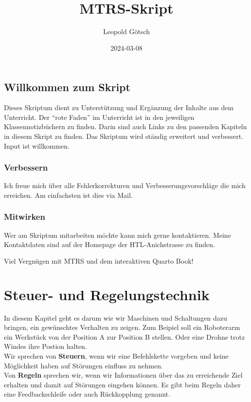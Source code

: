 \documentclass[
  letterpaper,
  DIV=11]{scrreprt}
\title{MTRS-Skript}
\author{Leopold Götsch}
\date{2024-03-08}
\renewcommand*\contentsname{Inhaltsverzeichnis}
\newcommand\contentsname{Inhaltsverzeichnis}
\begin{document}
\maketitle

\renewcommand*\contentsname{Inhaltsverzeichnis}
{
\hypersetup{linkcolor=}
\setcounter{tocdepth}{2}
\tableofcontents
}

\chapter*{Willkommen zum Skript}\label{willkommen-zum-skript}


Dieses Skriptum dient zu Unterstützung und Ergänzung der Inhalte aus dem
Unterricht. Der ``rote Faden'' im Unterricht ist in den jeweiligen
Klassennotizbüchern zu finden. Darin sind auch Links zu den passenden
Kapiteln in diesem Skript zu finden. Das Skriptum wird ständig erweitert
und verbessert. Input ist willkommen.

\section*{Verbessern}\label{verbessern}


Ich freue mich über alle Fehlerkorrekturen und Verbesserungsvorschläge
die mich erreichen. Am einfachsten ist dies via Mail.

\section*{Mitwirken}\label{mitwirken}


Wer am Skriptum mitarbeiten möchte kann mich gerne kontaktieren. Meine
Kontaktdaten sind auf der Homepage der HTL-Anichstrasse zu finden.

Viel Vergnügen mit MTRS und dem interaktiven Quarto Book!

\part{Steuer- und Regelungstechnik}

In diesem Kapitel geht es darum wie wir Maschinen und Schaltungen dazu
bringen, ein gewünschtes Verhalten zu zeigen. Zum Beipiel soll ein
Roboterarm ein Werkstück von der Position A zur Position B stellen. Oder
eine Drohne trotz Windes ihre Postion halten.\\
Wir sprechen von \textbf{Steuern}, wenn wir eine Befehlskette vorgeben
und keine Möglichkeit haben auf Störungen einfluss zu nehmen.\\
Von \textbf{Regeln} sprechen wir, wenn wir Informationen über das zu
erreichende Ziel erhalten und damit auf Störungen eingehen können. Es
gibt beim Regeln daher eine Feedbackschleife oder auch Rückkopplung
genannt.
\end{document}
